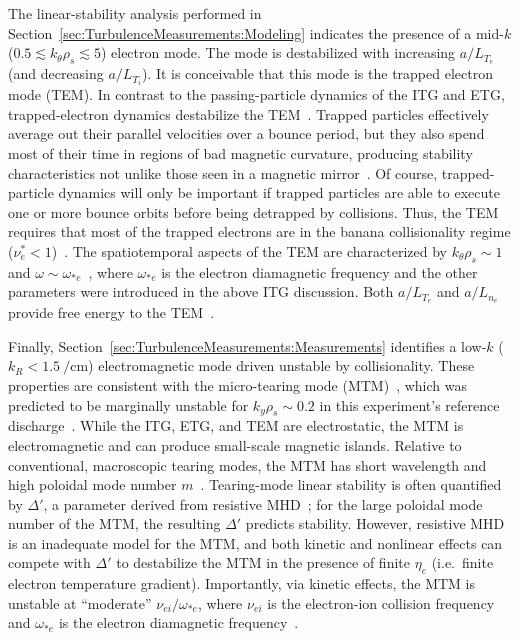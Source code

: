 The linear-stability analysis performed in
Section~\ref{sec:TurbulenceMeasurements:Modeling}
indicates the presence of
a mid-$k$ ($0.5 \lesssim k_{\theta} \rho_s \lesssim 5$) electron mode.
The mode is destabilized with
increasing $a / L_{T_e}$ (and decreasing $a / L_{T_i}$).
It is conceivable that this mode is
the trapped electron mode (TEM).
In contrast to the passing-particle dynamics of the ITG and ETG,
trapped-electron dynamics destabilize the TEM~\cite[Sec.~8.4]{wesson}.
Trapped particles effectively average out their parallel velocities
over a bounce period, but
they also spend most of their time
in regions of bad magnetic curvature,
producing stability characteristics
not unlike those seen in a magnetic mirror~\cite[Sec.~8.4]{wesson}.
Of course, trapped-particle dynamics
will only be important if
trapped particles are able to execute one or more bounce orbits
before being detrapped by collisions.
Thus, the TEM requires that most of the trapped electrons
are in the banana collisionality regime
($\nu_e^* < 1$)~\cite[Sec.~2.3.4.3]{fusion_physics_iaea}.
The spatiotemporal aspects of the TEM are characterized by
$k_{\theta} \rho_s \sim 1$ and
$\omega \sim \omega_{*e}$~\cite[Sec.~2.3.1]{fusion_physics_iaea},
where $\omega_{*e}$ is the electron diamagnetic frequency and
the other parameters were introduced in the above ITG discussion.
Both $a / L_{T_e}$ and $a / L_{n_e}$
provide free energy to the TEM~\cite[Sec.~2.3.1]{fusion_physics_iaea}.

Finally, Section~\ref{sec:TurbulenceMeasurements:Measurements}
identifies a low-$k$ ($k_R < \SI{1.5}{\per\centi\meter}$)
electromagnetic mode driven unstable by collisionality.
These properties are consistent with
the micro-tearing mode (MTM)~\cite[Sec.~8.5]{wesson},
which was predicted to be marginally unstable
for $k_y \rho_s \sim 0.2$
in this experiment's reference discharge~\cite{holland_nf17}.
While the ITG, ETG, and TEM are electrostatic,
the MTM is electromagnetic and
can produce small-scale magnetic islands.
Relative to conventional, macroscopic tearing modes,
the MTM has short wavelength and
high poloidal mode number $m$~\cite[Sec.~8.5]{wesson}.
Tearing-mode linear stability is often quantified by $\Delta'$,
a parameter derived from resistive MHD~\cite[Sec.~7.3]{wesson};
for the large poloidal mode number of the MTM,
the resulting $\Delta'$ predicts stability.
However, resistive MHD is an inadequate model for the MTM, and
both kinetic and nonlinear effects can compete with $\Delta'$
to destabilize the MTM in the presence of finite $\eta_e$
(i.e.\ finite electron temperature gradient).
Importantly, via kinetic effects, the MTM is unstable
at ``moderate'' $\nu_{ei} / \omega_{*e}$, where
$\nu_{ei}$ is the electron-ion collision frequency and
$\omega_{*e}$ is the electron diamagnetic frequency~\cite[Sec.~8.5]{wesson}.


